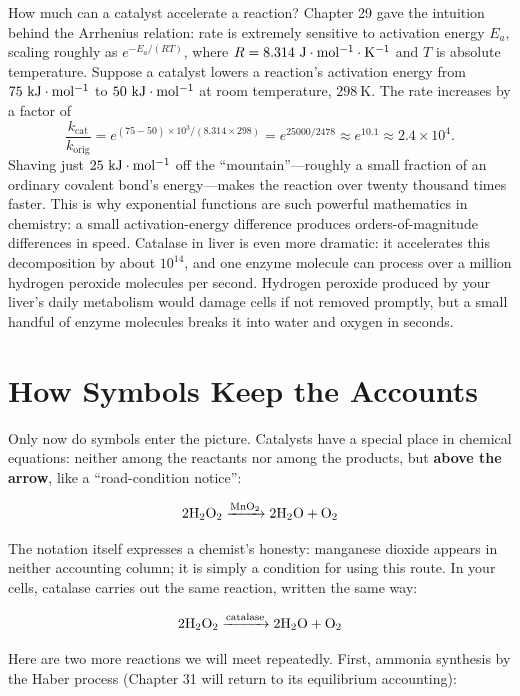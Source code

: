 \begin{qiaoliang}
How much can a catalyst accelerate a reaction? Chapter 29 gave the intuition behind the Arrhenius relation: rate is extremely sensitive to activation energy $E_a$, scaling roughly as $e^{-E_a/(RT)}$, where $R=8.314\ \mathrm{J\cdot mol^{-1}\cdot K^{-1}}$ and $T$ is absolute temperature. Suppose a catalyst lowers a reaction's activation energy from $75\ \mathrm{kJ\cdot mol^{-1}}$ to $50\ \mathrm{kJ\cdot mol^{-1}}$ at room temperature, $298\ \mathrm{K}$. The rate increases by a factor of
\[
\frac{k_{\text{cat}}}{k_{\text{orig}}} = e^{(75-50)\times 10^{3}/(8.314\times 298)} = e^{25000/2478} \approx e^{10.1} \approx 2.4\times 10^{4}.
\]
Shaving just $25\ \mathrm{kJ\cdot mol^{-1}}$ off the ``mountain''---roughly a small fraction of an ordinary covalent bond's energy---makes the reaction over twenty thousand times faster. This is why exponential functions are such powerful mathematics in chemistry: a small activation-energy difference produces orders-of-magnitude differences in speed. Catalase in liver is even more dramatic: it accelerates this decomposition by about $10^{14}$, and one enzyme molecule can process over a million hydrogen peroxide molecules per second. Hydrogen peroxide produced by your liver's daily metabolism would damage cells if not removed promptly, but a small handful of enzyme molecules breaks it into water and oxygen in seconds.
\end{qiaoliang}

\section{How Symbols Keep the Accounts}

Only now do symbols enter the picture. Catalysts have a special place in chemical equations: neither among the reactants nor among the products, but \textbf{above the arrow}, like a ``road-condition notice'':

\[\mathrm{2H_2O_2} \xrightarrow{\mathrm{MnO_2}} \mathrm{2H_2O} + \mathrm{O_2}\]

The notation itself expresses a chemist's honesty: manganese dioxide appears in neither accounting column; it is simply a condition for using this route. In your cells, catalase carries out the same reaction, written the same way:

\[\mathrm{2H_2O_2} \xrightarrow{\text{catalase}} \mathrm{2H_2O} + \mathrm{O_2}\]

Here are two more reactions we will meet repeatedly. First, ammonia synthesis by the Haber process (Chapter 31 will return to its equilibrium accounting):

